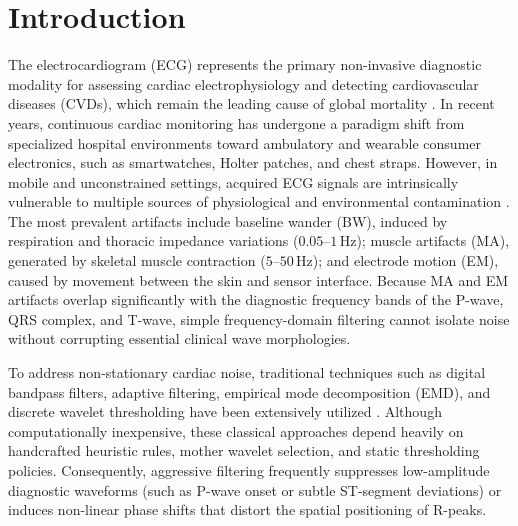 \section{Introduction}
\label{sec:intro}

The electrocardiogram (ECG) represents the primary non-invasive diagnostic modality for assessing cardiac electrophysiology and detecting cardiovascular diseases (CVDs), which remain the leading cause of global mortality \cite{clifford2006}. In recent years, continuous cardiac monitoring has undergone a paradigm shift from specialized hospital environments toward ambulatory and wearable consumer electronics, such as smartwatches, Holter patches, and chest straps. However, in mobile and unconstrained settings, acquired ECG signals are intrinsically vulnerable to multiple sources of physiological and environmental contamination \cite{clifford2006,jin2024}. The most prevalent artifacts include baseline wander (BW), induced by respiration and thoracic impedance variations ($0.05$--$1$\,Hz); muscle artifacts (MA), generated by skeletal muscle contraction ($5$--$50$\,Hz); and electrode motion (EM), caused by movement between the skin and sensor interface. Because MA and EM artifacts overlap significantly with the diagnostic frequency bands of the P-wave, QRS complex, and T-wave, simple frequency-domain filtering cannot isolate noise without corrupting essential clinical wave morphologies.

To address non-stationary cardiac noise, traditional techniques such as digital bandpass filters, adaptive filtering, empirical mode decomposition (EMD), and discrete wavelet thresholding have been extensively utilized \cite{clifford2006,goldberger2000}. Although computationally inexpensive, these classical approaches depend heavily on handcrafted heuristic rules, mother wavelet selection, and static thresholding policies. Consequently, aggressive filtering frequently suppresses low-amplitude diagnostic waveforms (such as P-wave onset or subtle ST-segment deviations) or induces non-linear phase shifts that distort the spatial positioning of R-peaks.

